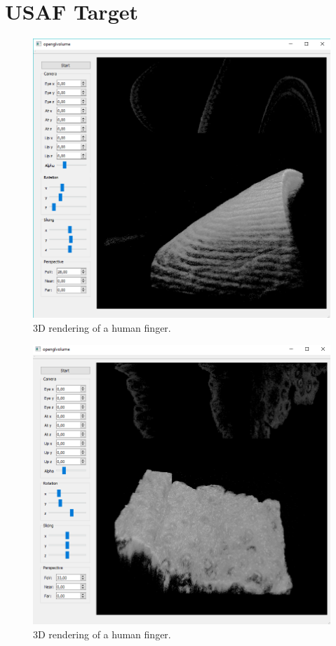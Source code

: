 \section{USAF Target}
    \begin{figure}[hbt]
        \centering
        \includegraphics[width=0.8\linewidth]{gfx/3d/finger}
        \caption[]{3D rendering of a human finger.}\label{fig:finger-3d}
    \end{figure}

	\begin{figure}[hbt]
		\centering
		\includegraphics[width=0.8\linewidth]{gfx/3d/dry-orange}
		\caption[]{3D rendering of a human finger.}\label{fig:orange-3d}
	\end{figure}

